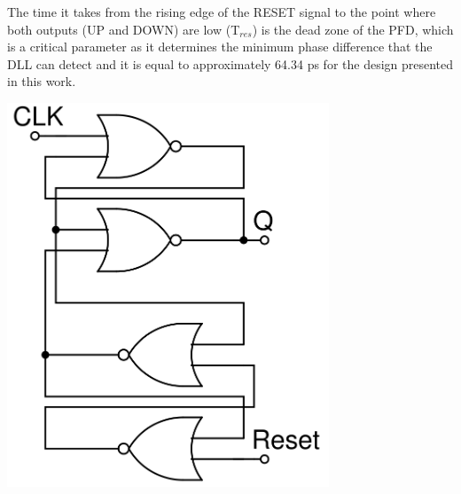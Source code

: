 The time it takes from the rising edge of the RESET signal to the point where both outputs (UP and DOWN) are low (T$_{res}$) is the dead zone of the PFD, which is a critical parameter as it determines the minimum
phase difference that the DLL can detect and it is equal to approximately 64.34 ps for the design presented in this work.


\noindent\begin{minipage}{0.48\textwidth}
    \begin{center}
        \includegraphics[width=0.72\textwidth]{figures/PFD_ff.png}
        \label{fig:D_ff}
    \end{center}
\end{minipage}
\hspace{0.02\textwidth}
